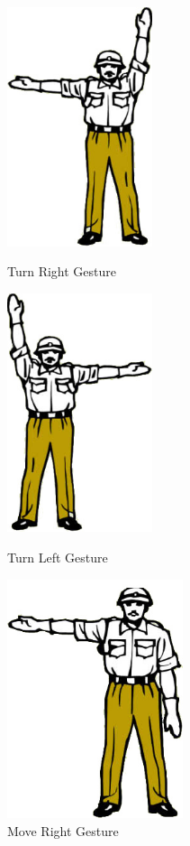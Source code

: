 \begin{figure}
	\centering 
	\begin{minipage}
		{.45 
			\textwidth} \centering 
		\includegraphics[height=7cm]{figures/content/ges-turn-right.jpg} \caption{Turn Right Gesture} \label{fg:ges:3} 
	\end{minipage}
	\begin{minipage}
		{.45 
		\textwidth} \centering 
		\includegraphics[height=7cm]{figures/content/ges-turn-left.jpg} \caption{Turn Left Gesture} \label{fg:ges:2} 
	\end{minipage}
	\begin{minipage}
		{.45 
		\textwidth} \centering 
		\includegraphics[height=7cm]{figures/content/ges-move-right.jpg} \caption{Move Right Gesture} \label{fg:ges:5} 

\end{minipage}
\end{figure}
